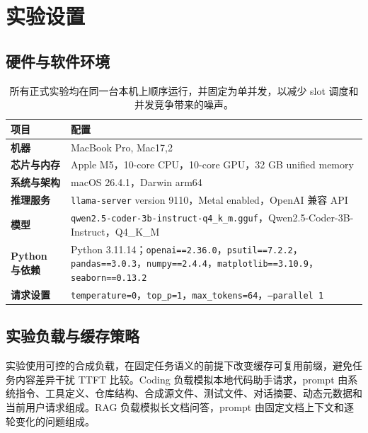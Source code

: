 \documentclass[10pt]{article}
\begin{document}
\section{实验设置}
\label{sec:setup}

\subsection{硬件与软件环境}

\begin{table}[H]
  \caption{所有正式实验均在同一台本机上顺序运行，并固定为单并发，以减少 slot 调度和并发竞争带来的噪声。}
  \label{tab:environment}
  \centering
  \footnotesize
  \setlength{\tabcolsep}{5pt}
  \begin{tabularx}{0.85\linewidth}{@{}>{\bfseries}lY@{}}
    \toprule
    \textbf{项目} & \textbf{配置} \\
    \midrule
    机器 & MacBook Pro, Mac17,2 \\
    芯片与内存 & Apple M5，10-core CPU，10-core GPU，32 GB unified memory \\
    系统与架构 & macOS 26.4.1，Darwin arm64 \\
    推理服务 & \texttt{llama-server} version 9110，Metal enabled，OpenAI 兼容 API~\cite{ggml2026llamaserver} \\
    模型 & \texttt{qwen2.5-coder-3b-instruct-q4\_k\_m.gguf}，Qwen2.5-Coder-3B-Instruct，Q4\_K\_M~\cite{hui2024qwen25coder} \\
    Python 与依赖 & Python 3.11.14；\texttt{openai==2.36.0}，\texttt{psutil==7.2.2}，\texttt{pandas==3.0.3}，\texttt{numpy==2.4.4}，\texttt{matplotlib==3.10.9}，\texttt{seaborn==0.13.2} \\
    请求设置 & \texttt{temperature=0}，\texttt{top\_p=1}，\texttt{max\_tokens=64}，\texttt{--parallel 1} \\
    \bottomrule
  \end{tabularx}
\end{table}

\subsection{实验负载与缓存策略}

实验使用可控的合成负载，在固定任务语义的前提下改变缓存可复用前缀，避免任务内容差异干扰 TTFT 比较。Coding 负载模拟本地代码助手请求，prompt 由系统指令、工具定义、仓库结构、合成源文件、测试文件、对话摘要、动态元数据和当前用户请求组成。RAG 负载模拟长文档问答，prompt 由固定文档上下文和逐轮变化的问题组成。
\end{document}
